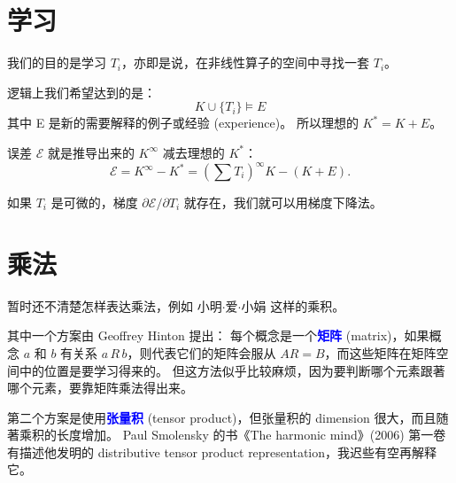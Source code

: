 \documentclass[12pt]{article}
\newcommand{\concept}[1]{\textbf{\textcolor{blue}{#1}}}
\newcommand{\formula}[1]{\textcolor{LogicColor}{#1}}
\begin{document}
\section{学习}

我们的目的是学习 $T_i$，亦即是说，在非线性算子的空间中寻找一套 $T_i$。

逻辑上我们希望达到的是：
$$ K \cup \{ T_i \} \models E $$
其中 E 是新的需要解释的例子或经验 (experience)。 所以理想的 $K^* = K + E$。 

误差 $\mathcal{E}$ 就是推导出来的 $K^\infty$ 减去理想的 $K^*$：
$$ \mathcal{E} = K^\infty - K^* = (\sum T_i) ^\infty K - (K + E) . $$

如果 $T_i$ 是可微的，梯度 $\partial\mathcal{E}/\partial T_i$ 就存在，我们就可以用梯度下降法。

\section{乘法}

暂时还不清楚怎样表达乘法，例如 \formula{小明$\cdot$爱$\cdot$小娟} 这样的乘积。 

其中一个方案由 Geoffrey Hinton 提出： 每个概念是一个\concept{矩阵} (matrix)，如果概念 $a$ 和 $b$ 有关系 $a\, R\, b$，则代表它们的矩阵会服从 $ AR = B $，而这些矩阵在矩阵空间中的位置是要学习得来的。  但这方法似乎比较麻烦，因为要判断哪个元素跟著哪个元素，要靠矩阵乘法得出来。

第二个方案是使用\concept{张量积} (tensor product)，但张量积的 dimension 很大，而且随著乘积的长度增加。 Paul Smolensky 的书《The harmonic mind》(2006) 第一卷有描述他发明的 distributive tensor product representation，我迟些有空再解释它。 
\end{document}
